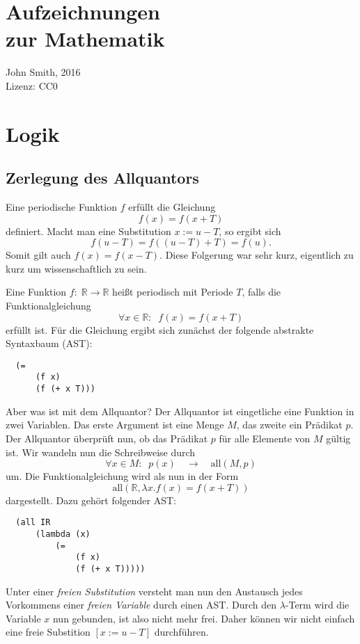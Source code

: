 \documentclass[a4paper,10pt,fleqn,twocolumn,twoside]{article}
\begin{document}
\section*{Aufzeichnungen\\
zur Mathematik}
John Smith, 2016\\
Lizenz: CC0

\tableofcontents

\section{Logik}
\subsection{Zerlegung des Allquantors}
Eine periodische Funktion $f$ erfüllt die Gleichung
\begin{equation}
f(x) = f(x+T)
\end{equation}
definiert. Macht man eine Substitution $x:=u-T$, so ergibt sich
\begin{equation}
f(u-T) = f((u-T)+T) = f(u).
\end{equation}
Somit gilt auch $f(x)=f(x-T)$. Diese Folgerung war sehr kurz,
eigentlich zu kurz um wissenschaftlich zu sein.

Eine Funktion $f{:}\;\mathbb R\rightarrow\mathbb R$
heißt periodisch mit Periode $T$, falls die
Funktionalgleichung
\begin{equation}
\forall x{\in}\mathbb R{:}\;\; f(x) = f(x+T)
\end{equation}
erfüllt ist. Für die Gleichung ergibt sich zunächst
der folgende abstrakte Syntaxbaum (AST):
\begin{verbatim}
  (=
      (f x)
      (f (+ x T)))
\end{verbatim}
Aber was ist mit dem Allquantor? Der Allquantor ist eingetliche
eine Funktion in zwei Variablen. Das erste Argument ist eine Menge $M$,
das zweite ein Prädikat $p$. Der Allquantor überprüft nun, ob das
Prädikat $p$ für alle Elemente von $M$ gültig ist. Wir wandeln nun
die Schreibweise durch
\begin{equation}
\forall x{\in}M{:}\;\; p(x)\quad\longrightarrow\quad
\mathrm{all}(M,p)
\end{equation}
um. Die Funktionalgleichung wird als nun in der Form
\begin{equation}\label{periodisch-all}
\mathrm{all}(\mathbb R,\lambda x. f(x) = f(x+T))
\end{equation}
dargestellt. Dazu gehört folgender AST:
\begin{verbatim}
  (all IR
      (lambda (x)
          (=
              (f x)
              (f (+ x T)))))
\end{verbatim}
Unter einer \textit{freien Substitution} versteht man nun den
Austausch jedes Vorkommens einer \textit{freien Variable}
durch einen AST. Durch den $\lambda$-Term wird die
Variable $x$ nun gebunden, ist also nicht mehr frei.
Daher können wir nicht einfach eine freie Substition
$[x{:=}u{-}T]$ durchführen.
\end{document}
